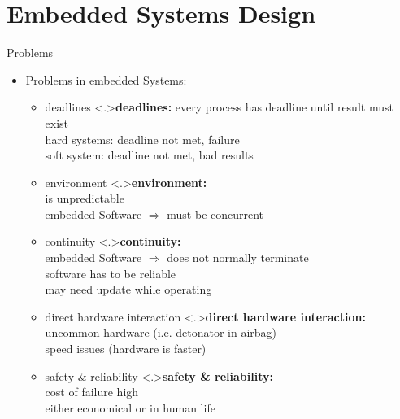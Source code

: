 \documentclass[ngerman={babel}, utf8, bigger, xcolor={table,dvipsnames}, ompress, hyperref={bookmarks,colorlinks}]{beamer}
\begin{document}
\section{Embedded Systems Design}
\begin{frame}{Problems}
	\begin{itemize}
		\item Problems in embedded Systems:
		\begin{itemize}
			\item deadlines
			\note<.>{\textbf{deadlines:} every process has deadline until result must exist \\ hard systems: deadline not met, failure\\ soft system: deadline not met, bad results}
			\item environment
			\note<.>{\textbf{environment:}\\ is unpredictable \\ embedded Software $\Rightarrow$ must be concurrent}
			\item continuity
			\note<.>{\textbf{continuity:}\\ embedded Software $\Rightarrow$ does not normally terminate \\ software has to be reliable \\ may need update while operating}
			\item direct hardware interaction
			\note<.>{\textbf{direct hardware interaction:}\\ uncommon hardware (i.e. detonator in airbag) \\ speed issues (hardware is faster)}
			\item safety \& reliability
			\note<.>{\textbf{safety \& reliability:}\\ cost of failure high \\ either economical or in human life}
		\end{itemize}
	\end{itemize}
\end{frame}
\end{document}
